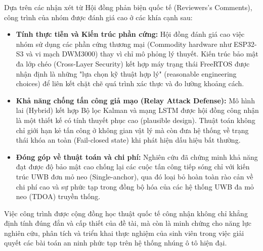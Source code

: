Dựa trên các nhận xét từ Hội đồng phản biện quốc tế (Reviewers's Comments), công trình của nhóm được đánh giá cao ở các khía cạnh sau:
\begin{itemize}
    \item \textbf{Tính thực tiễn và Kiến trúc phần cứng:} Hội đồng đánh giá cao việc nhóm sử dụng các phần cứng thương mại (Commodity hardware như ESP32-S3 và vi mạch DWM3000) thay vì chỉ mô phỏng lý thuyết. Kiến trúc bảo mật đa lớp chéo (Cross-Layer Security) kết hợp máy trạng thái FreeRTOS được nhận định là những "lựa chọn kỹ thuật hợp lý" (reasonable engineering choices) để liên kết chặt chẽ quá trình xác thực và đo lường khoảng cách.
    \item \textbf{Khả năng chống tấn công giả mạo (Relay Attack Defense):} Mô hình lai (Hybrid) kết hợp Bộ lọc Kalman và mạng LSTM được hội đồng công nhận là một thiết kế có tính thuyết phục cao (plausible design). Thuật toán không chỉ giới hạn kẻ tấn công ở không gian vật lý mà còn đưa hệ thống về trạng thái khóa an toàn (Fail-closed state) khi phát hiện dấu hiệu bất thường.
    \item \textbf{Đóng góp về thuật toán và chi phí:} Nghiên cứu đã chứng minh khả năng đạt được độ bảo mật cao chống lại các cuộc tấn công tiếp sóng chỉ với kiến trúc UWB đơn mỏ neo (Single-anchor), qua đó loại bỏ hoàn toàn rào cản về chi phí cao và sự phức tạp trong đồng bộ hóa của các hệ thống UWB đa mỏ neo (TDOA) truyền thống.
\end{itemize}

Việc công trình được cộng đồng học thuật quốc tế công nhận không chỉ khẳng định tính đúng đắn và cấp thiết của đề tài, mà còn là minh chứng cho năng lực nghiên cứu, phân tích và triển khai thực nghiệm của sinh viên trong việc giải quyết các bài toán an ninh phức tạp trên hệ thống nhúng ô tô hiện đại.


